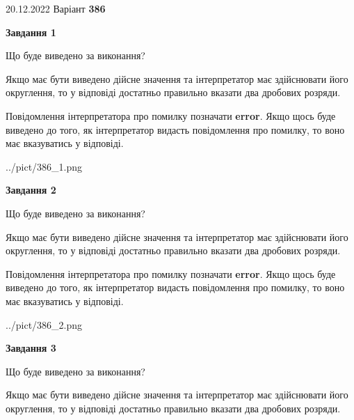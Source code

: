 \documentclass[12pt, ukrainian]{article}
\begin{document}
{20.12.2022 Варіант \No \textbf { 386 }\par}
{
\begin {Large}

{\begin {center}\textbf{Завдання 1}\end {center}}\par
Що буде виведено за виконання? \par

Якщо має бути виведено дійсне значення та інтерпретатор має здійснювати його округлення, 
то у відповіді достатньо правильно вказати два дробових розряди.

Повідомлення інтерпретатора про помилку позначати \textbf{error}.
Якщо щось буде виведено до того, як інтерпретатор видасть повідомлення про помилку, 
то воно має вказуватись у відповіді. \par

\begin{center}
	{../pict/386_1.png}
\end{center}
\newpage

{\begin {center}\textbf{Завдання 2}\end {center}}\par
Що буде виведено за виконання? \par

Якщо має бути виведено дійсне значення та інтерпретатор має здійснювати його округлення, 
то у відповіді достатньо правильно вказати два дробових розряди.

Повідомлення інтерпретатора про помилку позначати \textbf{error}.
Якщо щось буде виведено до того, як інтерпретатор видасть повідомлення про помилку, 
то воно має вказуватись у відповіді. \par

\begin{center}
	{../pict/386_2.png}
\end{center}
\newpage

{\begin {center}\textbf{Завдання 3}\end {center}}\par
Що буде виведено за виконання? \par

Якщо має бути виведено дійсне значення та інтерпретатор має здійснювати його округлення, 
то у відповіді достатньо правильно вказати два дробових розряди.


\end{Large}}
\end{document}
